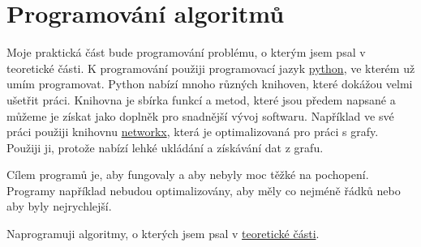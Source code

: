 \chapter{Programování algoritmů}
\label{chap:programovani}

Moje praktická část bude programování problému, o kterým jsem psal v teoretické části. K programování použiji programovací jazyk \href{https://www.python.org/}{python}, ve kterém už umím programovat. Python nabízí mnoho různých knihoven, které dokážou velmi ušetřit práci. Knihovna je sbírka funkcí a metod, které jsou předem napsané a můžeme je získat jako doplněk pro snadnější vývoj softwaru. Například ve své práci použiji knihovnu \href{https://networkx.org/}{networkx}, která je optimalizovaná pro práci s grafy. Použiji ji, protože nabízí lehké ukládání a získávání dat z grafu.

Cílem programů je, aby fungovaly a aby nebyly moc těžké na pochopení. Programy například nebudou optimalizovány, aby měly co nejméně řádků nebo aby byly nejrychlejší.

Naprogramuji algoritmy, o kterých jsem psal v \hyperref[part:teoreticka-cast]{teoretické části}.

% 


